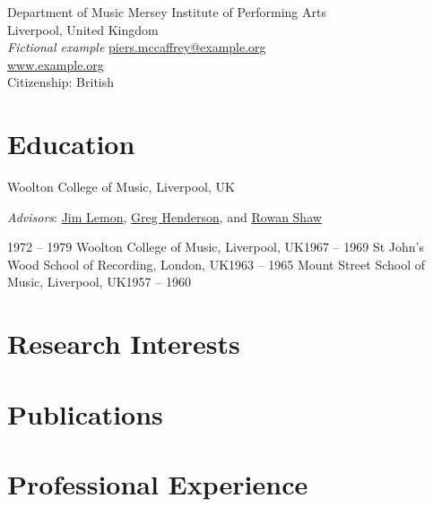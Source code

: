 \documentclass[11pt,a4paper]{article}
\newcommand{\JimLemon}{\href{https://example.org}{Jim Lemon}}
\newcommand{\GregHenderson}{\href{https://example.org}{Greg Henderson}}
\newcommand{\RowanShaw}{\href{https://example.org}{Rowan Shaw}}
\begin{document}
  {Department of Music \cvbullet{} Mersey Institute of Performing Arts\\
   Liverpool, United Kingdom\\
   \textit{Fictional example}}
  {\href{mailto:piers.mccaffrey@example.org}{piers.mccaffrey@example.org}\\
   \href{https://example.org}{www.example.org}\\
   Citizenship: British}

\section{Education}

  {Woolton College of Music, Liverpool, UK\par
   \cvbullet{} \textit{Advisors}: \JimLemon, \GregHenderson, and \RowanShaw}
  {1972 -- 1979}{}
  {Woolton College of Music, Liverpool, UK}{1967 -- 1969}{}
  {St John's Wood School of Recording, London, UK}{1963 -- 1965}{}
  {Mount Street School of Music, Liverpool, UK}{1957 -- 1960}{}

\section{Research Interests}


\section{Publications}

\nocite{*}



\section{Professional Experience}
\end{document}
